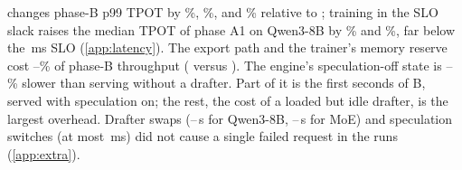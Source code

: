  changes phase-B p99 TPOT by \%, \%, and \% relative to ; training in the SLO slack raises the median TPOT of phase A1 on Qwen3-8B by \% and \%, far below the \,ms SLO (\cref{app:latency}). The export path and the trainer's memory reserve cost --\% of phase-B throughput ( versus ). The engine's speculation-off state is --\% slower than serving without a drafter. Part of it is the first seconds of B, served with speculation on; the rest, the cost of a loaded but idle drafter, is the largest overhead. Drafter swaps (--\,s for Qwen3-8B, --\,s for MoE) and speculation switches (at most \,ms) did not cause a single failed request in the  runs (\cref{app:extra}).


